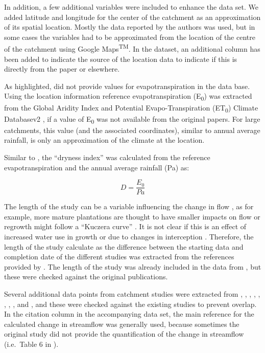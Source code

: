 \documentclass[]{elsarticle} %
\begin{document}
In addition, a few additional variables were included to enhance the data set. We added latitude and longitude for the center of the catchment as an approximation of its spatial location. Mostly the data reported by the authors was used, but in some cases the variables had to be approximated from the location of the centre of the catchment using Google Maps\textsuperscript{TM}. In the dataset, an additional column has been added to indicate the source of the location data to indicate if this is directly from the paper or elsewhere.

As highlighted, \citet{zhang2017} did not provide values for evapotranspiration in the data base. Using the location information reference evapotranspiration (E\textsubscript{0}) was extracted from the Global Aridity Index and Potential Evapo-Transpiration (ET\textsubscript{0}) Climate Databasev2 \citep{trabucco2018}, if a value of E\textsubscript{0} was not available from the original papers. For large catchments, this value (and the associated coordinates), similar to annual average rainfall, is only an approximation of the climate at the location.

Similar to \citet{zhang2017}, the ``dryness index'' was calculated from the reference evapotranspiration and the annual average rainfall (Pa) as:

\begin{equation}
D = \frac{E_{0}}{Pa} \label{eq:eq1}
\end{equation}

The length of the study can be a variable influencing the change in flow \citep[e.g.][]{jackson2005, filoso2017}, as for example, more mature plantations are thought to have smaller impacts on flow or regrowth might follow a ``Kuczera curve'' \citep{kuczera1987}. It is not clear if this is an effect of increased water use in growth \citep{vertessy2001} or due to changes in interception \citep{stoof2012}. Therefore, the length of the study calculate as the difference between the starting data and completion date of the different studies was extracted from the references provided by \citet{zhang2017}. The length of the study was already included in the data from \citet{filoso2017}, but these were checked against the original publications.

Several additional data points from catchment studies were extracted from \citet{almeida2016}, \citet{ferreto2020}, \citet{zhang2011}, \citet{zhao2010}, \citet{borg1988}, \citet{thornton2007}, \citet{zhou2010}, \citet{rodriguez2010}, \citet{ruprechtetal1991} and \citet{penaarancibia2012}, and these were checked against the existing studies to prevent overlap. In the citation column in the accompanying data set, the main reference for the calculated change in streamflow was generally used, because sometimes the original study did not provide the quantification of the change in streamflow (i.e.~Table 6 in \citet{zhang2011}).
\end{document}
